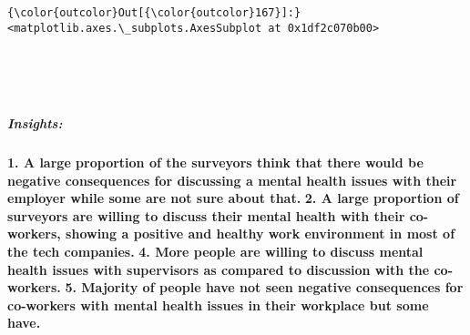 \documentclass[11pt]{article}
\begin{document}
\begin{Verbatim}[commandchars=\\\{\}]
{\color{outcolor}Out[{\color{outcolor}167}]:} <matplotlib.axes.\_subplots.AxesSubplot at 0x1df2c070b00>
\end{Verbatim}
            
    \begin{center}
    \end{center}
    { \hspace*{\fill} \\}
    
    \begin{center}
    \end{center}
    { \hspace*{\fill} \\}
    
    \hypertarget{insights}{%
\subparagraph{Insights:}\label{insights}}

\textbf{1. A large proportion of the surveyors think that there would be
negative consequences for discussing a mental health issues with their
employer while some are not sure about that.} \textbf{2. A large
proportion of surveyors are willing to discuss their mental health with
their co-workers, showing a positive and healthy work environment in
most of the tech companies.} \textbf{4. More people are willing to
discuss mental health issues with supervisors as compared to discussion
with the co-workers.} \textbf{5. Majority of people have not seen
negative consequences for co-workers with mental health issues in their
workplace but some have.}
\end{document}
